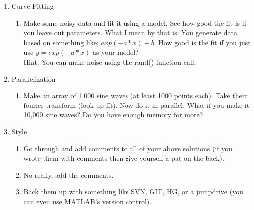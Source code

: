 \begin{enumerate}
 \item Curve Fitting
  \begin{enumerate}
   \item Make some noisy data and fit it using a model. See how good the fit is if you leave out parameters. What I mean by that is: You generate data based on something like; $exp(-a*x) + b$. How good is the fit if you just use $y = exp(-a*x)$ as your model? \\
Hint: You can make noise using the rand() function call.
  \end{enumerate}

 \item Parallelization
  \begin{enumerate}
   \item Make an array of 1,000 sine waves (at least 1000 points each). Take their fourier-transform (look up fft). Now do it in parallel. What if you make it 10,000 sine waves? Do you have enough memory for more?
  \end{enumerate}

 \item Style
  \begin{enumerate}
   \item Go through and add comments to all of your above solutions (if you wrote them with comments then give yourself a pat on the back).
   \item No really, add the comments.
   \item Back them up with something like SVN, GIT, HG, or a jumpdrive (you can even use MATLAB's version control).
  \end{enumerate}
\end{enumerate}
